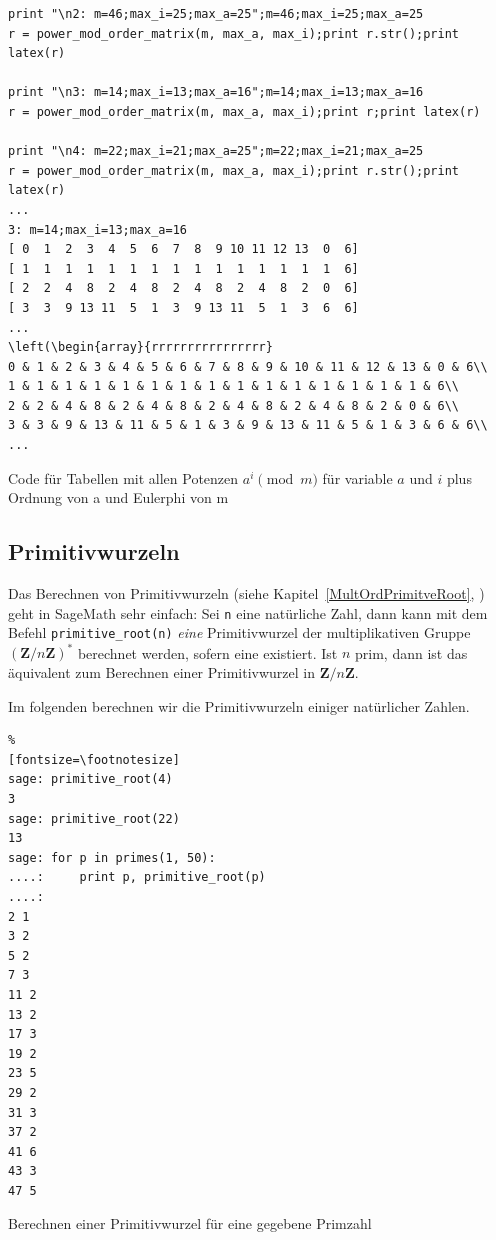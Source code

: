 \begin{refsegment}
\begin{sagecode}
\begin{Verbatim}
print "\n2: m=46;max_i=25;max_a=25";m=46;max_i=25;max_a=25
r = power_mod_order_matrix(m, max_a, max_i);print r.str();print latex(r)

print "\n3: m=14;max_i=13;max_a=16";m=14;max_i=13;max_a=16
r = power_mod_order_matrix(m, max_a, max_i);print r;print latex(r)

print "\n4: m=22;max_i=21;max_a=25";m=22;max_i=21;max_a=25
r = power_mod_order_matrix(m, max_a, max_i);print r.str();print latex(r)
...
3: m=14;max_i=13;max_a=16
[ 0  1  2  3  4  5  6  7  8  9 10 11 12 13  0  6]
[ 1  1  1  1  1  1  1  1  1  1  1  1  1  1  1  6]
[ 2  2  4  8  2  4  8  2  4  8  2  4  8  2  0  6]
[ 3  3  9 13 11  5  1  3  9 13 11  5  1  3  6  6]
...
\left(\begin{array}{rrrrrrrrrrrrrrrr}
0 & 1 & 2 & 3 & 4 & 5 & 6 & 7 & 8 & 9 & 10 & 11 & 12 & 13 & 0 & 6\\
1 & 1 & 1 & 1 & 1 & 1 & 1 & 1 & 1 & 1 & 1 & 1 & 1 & 1 & 1 & 6\\
2 & 2 & 4 & 8 & 2 & 4 & 8 & 2 & 4 & 8 & 2 & 4 & 8 & 2 & 0 & 6\\
3 & 3 & 9 & 13 & 11 & 5 & 1 & 3 & 9 & 13 & 11 & 5 & 1 & 3 & 6 & 6\\
...
\end{Verbatim}
\caption{Code für Tabellen mit allen Potenzen $a^i \pmod{m}$ für variable $a$ und $i$ plus Ordnung von a und Eulerphi von m}
\end{sagecode}




\newpage
\hypertarget{nt:AppArith3a2}{}
\subsection{Primitivwurzeln}
\label{nt:AppArith3a2}
\label{primitive-roots-with-sage}

Das Berechnen von Primitivwurzeln
(siehe Kapitel~\ref{MultOrdPrimitveRoot}, \glqq {}\grqq)
geht in SageMath sehr einfach: Sei \verb!n! eine natürliche Zahl, dann kann mit dem Befehl
\verb!primitive_root(n)! \textit{eine} Primitivwurzel der multiplikativen Gruppe
$(\mathbf{Z} / n \mathbf{Z})^{\ast}$ berechnet werden, sofern eine existiert.
Ist $n$ prim, dann ist das äquivalent zum Berechnen einer Primitivwurzel in
$\mathbf{Z} / n \mathbf{Z}$.

\noindent Im folgenden berechnen wir die Primitivwurzeln einiger natürlicher Zahlen.

\begin{sagecode}
\begin{Verbatim}%
[fontsize=\footnotesize]
sage: primitive_root(4)
3
sage: primitive_root(22)
13
sage: for p in primes(1, 50):
....:     print p, primitive_root(p)
....:
2 1
3 2
5 2
7 3
11 2
13 2
17 3
19 2
23 5
29 2
31 3
37 2
41 6
43 3
47 5
\end{Verbatim}
\caption{Berechnen einer Primitivwurzel für eine gegebene Primzahl}
\end{sagecode}


\end{refsegment}
